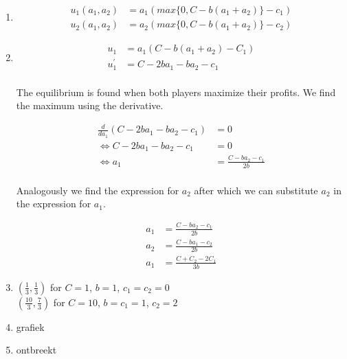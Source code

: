 \documentclass[../main.tex]{subfiles}
\begin{document}
\begin{solution}
	\begin{enumerate}
	\item
		\begin{align}
		u_1(a_1,a_2)& = a_1(max\{0,C-b(a_1+a_2)\} - c_1)\\
		u_2(a_1,a_2)& = a_2(max\{0,C-b(a_1+a_2)\} - c_2)
		\end{align}


	\item
		\begin{align}
		u_1& = a_1(C-b(a_1+a_2) - C_1)\\
		u_1^{'}& = C - 2ba_1 - ba_2 - c_1\\
		\end{align}

        The equilibrium is found when both players maximize their profits. We
        find the maximum using the derivative.

        \begin{align}
         \frac{d}{da_1}(C - 2ba_1 - ba_2 - c_1)  & = 0 \\
		\Leftrightarrow  C - 2ba_1 - ba_2 - c_1  & = 0 \\
        \Leftrightarrow  a_1& = \frac{C-ba_2 - c_1}{2b}\\
        \end{align}

        Analogously we find the expression for $a_2$ after which we can
        substitute $a_2$ in the expression for $a_1$.

		\begin{align}
		a_1& = \frac{C-ba_2 - c_1}{2b}\\
		a_2& = \frac{C - ba_1 - c_2}{2b}\\
		a_1& = \frac{C+C_2 - 2C_1}{3b}
		\end{align}

	\item
		$(\frac{1}{3},\frac{1}{3})$ for $C = 1$, $b = 1$, $c_1 = c_2 = 0$\\
		$(\frac{10}{3},\frac{7}{3})$ for $C = 10$, $b = c_1 = 1$, $c_2 = 2$

	\item grafiek %
	\item ontbreekt %
	\end{enumerate}
\end{solution}

\begin{question}
\end{question}
\end{document}

